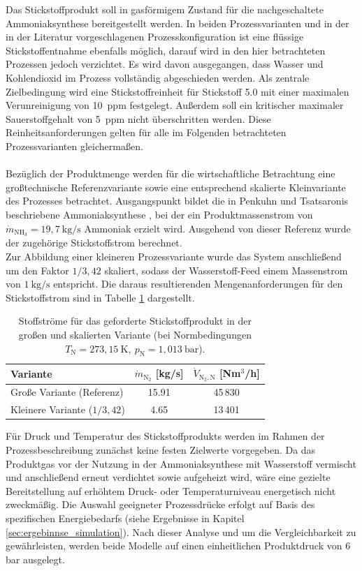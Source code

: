 Das Stickstoffprodukt soll in gasförmigem Zustand für die nachgeschaltete Ammoniaksynthese bereitgestellt werden. In beiden Prozessvarianten und in der in der Literatur vorgeschlagenen Prozesskonfiguration ist eine flüssige Stickstoffentnahme ebenfalls möglich, darauf wird in den hier betrachteten Prozessen jedoch verzichtet. Es wird davon ausgegangen, dass Wasser und Kohlendioxid im Prozess vollständig abgeschieden werden. Als zentrale Zielbedingung wird eine Stickstoffreinheit für Stickstoff 5.0 mit einer maximalen Verunreinigung von \SI{10}{ppm} festgelegt. Außerdem soll ein kritischer maximaler Sauerstoffgehalt von \SI{5}{ppm} nicht überschritten werden. Diese Reinheitsanforderungen gelten für alle im Folgenden betrachteten Prozessvarianten gleichermaßen.\\
\\
Bezüglich der Produktmenge werden für die wirtschaftliche Betrachtung eine großtechnische Referenzvariante sowie eine entsprechend skalierte Kleinvariante des Prozesses betrachtet. Ausgangspunkt bildet die in Penkuhn und Tsatsaronis beschriebene Ammoniaksynthese \cite{penkuhn_comparison_2017}, bei der ein Produktmassenstrom von \(\dot{m}_{\mathrm{NH_3}} = 19{,}7~\mathrm{kg/s}\) Ammoniak erzielt wird. Ausgehend von dieser Referenz wurde der zugehörige Stickstoffstrom berechnet. \\
Zur Abbildung einer kleineren Prozessvariante wurde das System anschließend um den Faktor \(1/3{,}42\) skaliert, sodass der Wasserstoff-Feed einem Massenstrom von \(1~\mathrm{kg/s}\) entspricht. Die daraus resultierenden Mengenanforderungen für den Stickstoffstrom sind in Tabelle \ref{tab:n2_produktstreams} dargestellt.
\begin{table}[h]
\centering
\caption{Stoffströme für das geforderte Stickstoffprodukt in der großen und skalierten Variante (bei Normbedingungen \(T_\mathrm{N}=273{,}15~\mathrm{K},\ p_\mathrm{N}=1{,}013~\mathrm{bar}\)).}
\label{tab:n2_produktstreams}
\begin{tabular}{lcc}
\toprule
\textbf{Variante} & 
\(\dot{m}_{\mathrm{N_2}}\) [kg/s] &
\(\dot{V}_{\mathrm{N_2,N}}\) [Nm\(^3\)/h] \\
\midrule
Große Variante (Referenz) & 15.91 & 45\,830 \\
Kleinere Variante (\(1/3{,}42\)) & 4.65 & 13\,401 \\
\bottomrule
\end{tabular}
\end{table}
Für Druck und Temperatur des Stickstoffprodukts werden im Rahmen der Prozessbeschreibung zunächst keine festen Zielwerte vorgegeben. Da das Produktgas vor der Nutzung in der Ammoniaksynthese mit Wasserstoff vermischt und anschließend erneut verdichtet sowie aufgeheizt wird, wäre eine gezielte Bereitstellung auf erhöhtem Druck- oder Temperaturniveau energetisch nicht zweckmäßig. Die Auswahl geeigneter Prozessdrücke erfolgt auf Basis des spezifischen Energiebedarfs (siehe Ergebnisse in Kapitel \ref{sec:ergebinnse_simulation}). Nach dieser Analyse und um die Vergleichbarkeit zu gewährleisten, werden beide Modelle auf einen einheitlichen Produktdruck von 6 bar ausgelegt. 

